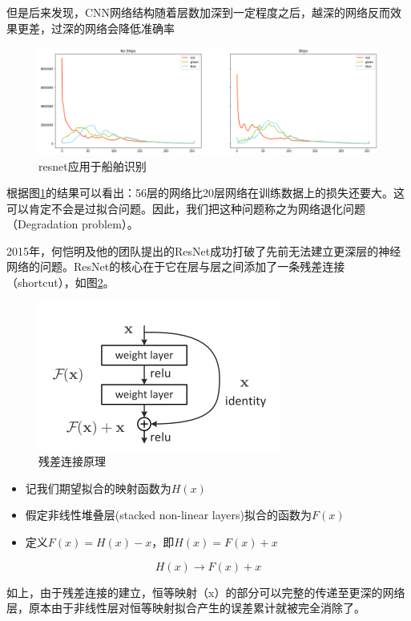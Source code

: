但是后来发现，CNN网络结构随着层数加深到一定程度之后，越深的网络反而效果更差，过深的网络会降低准确率

\begin{figure}[htbp]
\centering
\includegraphics[width=1\linewidth]{body/theory_pic/resnet3}
\caption{resnet应用于船舶识别}
\label{fig::theory9}
\end{figure}

根据图\ref{fig::theory9}的结果可以看出：56层的网络比20层网络在训练数据上的损失还要大。这可以肯定不会是过拟合问题。因此，我们把这种问题称之为网络退化问题（Degradation
problem）。

2015年，何恺明及他的团队提出的ResNet成功打破了先前无法建立更深层的神经网络的问题。ResNet的核心在于它在层与层之间添加了一条残差连接（shortcut），如图\ref{fig::theory10}。

\begin{figure}[htbp]
\centering
\includegraphics[width=0.6\linewidth]{body/theory_pic/resnet4}
\caption{残差连接原理}
\label{fig::theory10}
\end{figure}

\begin{itemize}
\tightlist
\item
  记我们期望拟合的映射函数为\(H(x)\)
\item
  假定非线性堆叠层(stacked non-linear layers)拟合的函数为\(F(x)\)
\item
  定义\(F(x) = H(x) - x\)，即\(H(x) = F(x) + x\)
\end{itemize}

\[H(x)\longrightarrow{F(x) + x}\]

如上，由于残差连接的建立，恒等映射（x）的部分可以完整的传递至更深的网络层，原本由于非线性层对恒等映射拟合产生的误差累计就被完全消除了。

